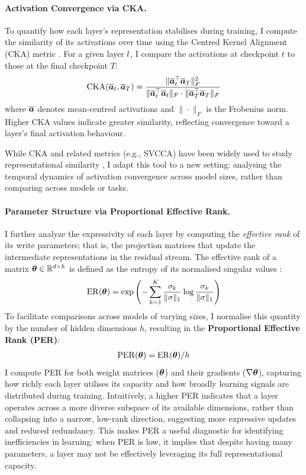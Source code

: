 \paragraph{Activation Convergence via CKA.}
To quantify how each layer's representation stabilises during training, I compute the similarity of its activations over time using the Centred Kernel Alignment (CKA) metric \citep{kornblith2019cka}. For a given layer $l$, I compare the activations at checkpoint $t$ to those at the final checkpoint $T$:
\begin{align}
    \mathrm{CKA}(\overline{\boldsymbol{a}}_{t}, \overline{\boldsymbol{a}}_{T}) = 
    \frac{\|\overline{\boldsymbol{a}}_{t}^{\top} \overline{\boldsymbol{a}}_{T}\|_F^2}
         {\|\overline{\boldsymbol{a}}_{t}^{\top} \overline{\boldsymbol{a}}_{t}\|_F \cdot \|\overline{\boldsymbol{a}}_{T}^{\top} \overline{\boldsymbol{a}}_{T}\|_F}
\end{align}
where $\overline{\boldsymbol{a}}$ denotes mean-centred activations and $\|\cdot\|_F$ is the Frobenius norm. Higher CKA values indicate greater similarity, reflecting convergence toward a layer's final activation behaviour.

While CKA and related metrics (e.g., SVCCA) have been widely used to study representational similarity \citep{wu2020similarity, phang2021finetuned, brown2023understanding}, I adapt this tool to a new setting: analysing the temporal dynamics of activation convergence across model sizes, rather than comparing across models or tasks.

\paragraph{Parameter Structure via Proportional Effective Rank.}
I further analyze the expressivity of each layer by computing the \textit{effective rank} of its write parameters; that is, the projection matrices that update the intermediate representations in the residual stream. The effective rank of a matrix $\boldsymbol{\theta} \in \mathbb{R}^{d \times h}$ is defined as the entropy of its normalised singular values \citep{roy2007effectiverank}:
\begin{align}
    \mathrm{ER}(\boldsymbol{\theta}) = \exp\left(-\sum_{k=1}^K \frac{\sigma_k}{\|\sigma\|_1} \log \frac{\sigma_k}{\|\sigma\|_1}\right)
\end{align}
To facilitate comparisons across models of varying sizes, I normalise this quantity by the number of hidden dimensions $h$, resulting in the \textbf{Proportional Effective Rank (PER)}:
\begin{align}
    \mathrm{PER}(\boldsymbol{\theta}) = \mathrm{ER}(\boldsymbol{\theta}) / h
\end{align}
I compute PER for both weight matrices ($\boldsymbol{\theta}$) and their gradients ($\nabla \boldsymbol{\theta}$), capturing how richly each layer utilises its capacity and how broadly learning signals are distributed during training. Intuitively, a higher PER indicates that a layer operates across a more diverse subspace of its available dimensions, rather than collapsing into a narrow, low-rank direction, suggesting more expressive updates and reduced redundancy. This makes PER a useful diagnostic for identifying inefficiencies in learning: when PER is low, it implies that despite having many parameters, a layer may not be effectively leveraging its full representational capacity.


